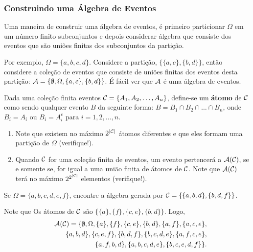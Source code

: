 \begin{frame}
\frametitle{Construindo uma Álgebra de Eventos}


\begin{nota} Uma maneira de construir uma álgebra de eventos, é primeiro
particionar $\Omega$ em um número finito subconjuntos e depois considerar álgebra que consiste
dos eventos que são uniões finitas dos subconjuntos da partição. \end{nota}

\begin{exem}
Por exemplo, $\Omega=\{a,b,c,d\}$. Considere a partição,
$\{\{a,c\},\{b,d\}\}$, então considere a coleção de eventos que consiste de uniões finitas dos eventos desta
partição: ${\cal A}=\{\emptyset, \Omega, \{a,c\},\{b,d\}\}$. É fácil ver
que ${\cal A}$ é uma álgebra de eventos.
\end{exem}

\end{frame}
%
\begin{frame}

\begin{defi}
Dada uma coleção finita eventos ${\cal C}=\{A_1,A_2,\ldots,A_n\}$, define-se um {\bf  átomo} de ${\cal C}$ como sendo qualquer evento
$B$ da seguinte forma: $B=B_1\cap B_2\cap\ldots\cap B_n$, onde $B_i=A_i$ ou $B_i=A_i^c$ para $i=1,2,\ldots,n$.
\end{defi}

\begin{exer}
	\begin{enumerate}
\item Note que existem no máximo $2^{|{\cal C}|}$ átomos diferentes e que eles formam uma partição de $\Omega$ (verifique!). 

\item Quando ${\cal C}$ for uma coleção finita de eventos, um evento pertencerá a ${\cal A}({\cal C})$, se e somente se,
for igual a uma união finita de átomos de ${\cal C}$. Note que ${\cal A}({\cal C})$ terá no máximo $2^{2^{|{\cal C}|}}$ elementos (verifique!).
\end{enumerate}
\end{exer}

\begin{exem}
Se $\Omega=\{a,b,c,d,e,f\}$, encontre a álgebra gerada por ${\cal C}=\{\{a,b,d\},\{b,d,f\}\}$.

Note que Os átomos de ${\cal C}$ são
$\{\{a\},\{f\},\{c,e\},\{b,d\}\}$. Logo,
\begin{eqnarray}
& & {\cal A}({\cal C})=\{\emptyset,\Omega,\{a\},\{f\},\{c,e\},\{b,d\},\{a,f\},\{a,c,e\},\nonumber \\
& & \{a,b,d\}, \{c,e,f\},\{b,d,f\},\{b,c,d,e\},\{a,f,c,e\},\nonumber \\
& & \{a,f,b,d\},\{a,b,c,d,e\},\{b,c,e,d,f\}\}.\nonumber
\end{eqnarray}
\end{exem}
%
\end{frame}
%


